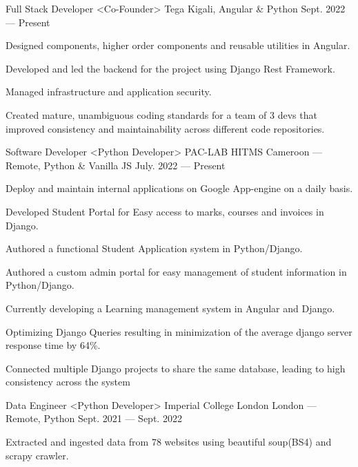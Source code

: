 \begin{cventries}

  \cventry
    {Full Stack Developer <Co-Founder>}
    {Tega}
    {Kigali, Angular \& Python}
    {Sept. 2022 --- Present}
    {
      \begin{cvitems}
        \item {Designed components, higher order components and reusable utilities in Angular.}
        \item {Developed and led the backend for the project using Django Rest Framework. }
        \item {Managed infrastructure and application security.}
        \item {Created mature, unambiguous coding standards for a team of 3 devs that improved consistency and maintainability across different code repositories.}
      \end{cvitems}
    }
  \cventry
    {Software Developer <Python Developer>}
    {PAC-LAB HITMS}
    {Cameroon --- Remote, Python \& Vanilla JS}
    {July. 2022 --- Present}
    {
      \begin{cvitems}
        \item {Deploy and maintain internal applications on Google App-engine on a daily basis.}
        \item {Developed Student Portal for Easy access to marks, courses and invoices in Django.}
        \item {Authored a functional Student Application system in Python/Django.}
        \item {Authored a custom admin portal for easy management of student information in Python/Django.}
        \item {Currently developing a Learning management system in Angular and Django.}
        \item {Optimizing Django Queries resulting in minimization of the average django server response time by 64\%. }
        \item {Connected multiple Django projects to share the same database, leading to high consistency across the system}
      \end{cvitems}
    }
  \cventry
    {Data Engineer <Python Developer>}
    {Imperial College London}
    {London --- Remote, Python}
    {Sept. 2021 --- Sept. 2022}
    {
      \begin{cvitems}
        \item {Extracted and ingested data from 78 websites using beautiful soup(BS4) and scrapy crawler.}

\end{cvitems}}
\end{cventries}
